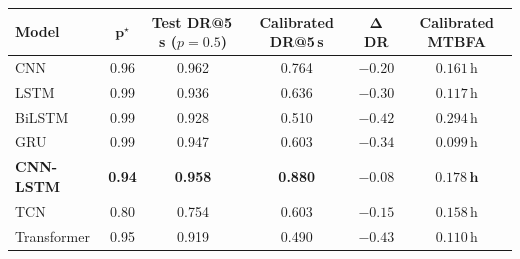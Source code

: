 \begin{tabular}{lccccc}
\toprule
\textbf{Model} & $\boldsymbol{p}^\star$ & \textbf{Test DR@5\,s ($p{=}0.5$)} & \textbf{Calibrated DR@5\,s} & $\boldsymbol{\Delta}$\textbf{DR} & \textbf{Calibrated MTBFA} \\
\midrule
CNN & 0.96 & 0.962 & 0.764 & $-0.20$ & $0.161\,$h \\
LSTM & 0.99 & 0.936 & 0.636 & $-0.30$ & $0.117\,$h \\
BiLSTM & 0.99 & 0.928 & 0.510 & $-0.42$ & $0.294\,$h \\
GRU & 0.99 & 0.947 & 0.603 & $-0.34$ & $0.099\,$h \\
\textbf{CNN-LSTM} & \textbf{0.94} & \textbf{0.958} & \textbf{0.880} & $\mathbf{-0.08}$ & $\mathbf{0.178\,h}$ \\
TCN & 0.80 & 0.754 & 0.603 & $-0.15$ & $0.158\,$h \\
Transformer & 0.95 & 0.919 & 0.490 & $-0.43$ & $0.110\,$h \\
\bottomrule
\end{tabular}

